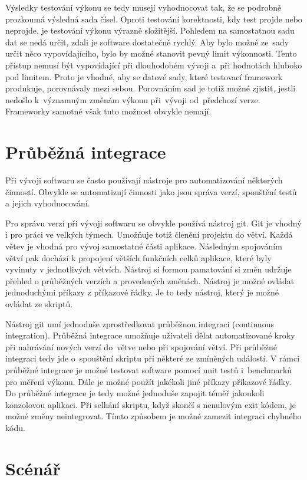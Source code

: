 Výsledky testování výkonu se tedy musejí vyhodnocovat tak, že se podrobně prozkoumá výsledná sada čísel.
Oproti testování korektnosti, kdy test projde nebo neprojde, je testování výkonu výrazně složitější.
Pohledem na samostatnou sadu dat se nedá určit, zdali je software dostatečně rychlý. Aby bylo možné
ze~sady určit něco vypovídajícího, bylo by možné stanovit pevný limit výkonnosti.
Tento přístup nemusí být vypovídající při dlouhodobém vývoji
a~při hodnotách hluboko pod limitem. Proto je vhodné, aby se datové sady, které testovací framework produkuje,
porovnávaly mezi sebou. Porovnáním sad je totiž možné zjistit, jestli nedošlo k~významným změnám výkonu
při~vývoji od~předchozí verze. Frameworky samotné však tuto možnost obvykle nemají.

\section{Průběžná integrace}
Při vývoji softwaru se často používají nástroje pro automatizování některých činností.
Obvykle se automatizují činnosti jako jsou správa verzí, spouštění testů a jejich vyhodnocování.

Pro správu verzí při vývoji softwaru se obvykle používá nástroj git.
Git je vhodný i pro práci ve velkých týmech.
Umožňuje totiž členění projektu do větví. Každá větev je vhodná pro vývoj samostatné části aplikace.
Následným spojováním větví pak dochází k propojení větších funkčních celků aplikace, které byly vyvinuty v jednotlivých větvích.
Nástroj si formou pamatování si změn udržuje přehled o průběžných verzích a provedených změnách.
Nástroj je možné ovládat jednoduchými příkazy z příkazové řádky.
Je to tedy nástroj, který je možné ovládat ze skriptů.

Nástroj git umí jednoduše zprostředkovat průběžnou integraci (continuous integration). Průběžná integrace umožňuje uživateli dělat automatizované
kroky při nahrávání nových verzí do~větve nebo při spojování větví. Při průběžné integraci tedy jde o~spouštění
skriptu při některé ze zmíněných událostí. V rámci průběžné integrace je možné testovat software pomocí unit testů
i~benchmarků pro měření výkonu. Dále je možné použít jakékoli jiné příkazy příkazové řádky.
Do průběžné integrace je tedy možné jednoduše zapojit téměř jakoukoli konzolovou aplikaci.
Při selhání skriptu, když skončí s nenulovým exit kódem, je možné změny neintegrovat.
Tímto způsobem je možné zamezit integraci chybného kódu.

\section{Scénář}

